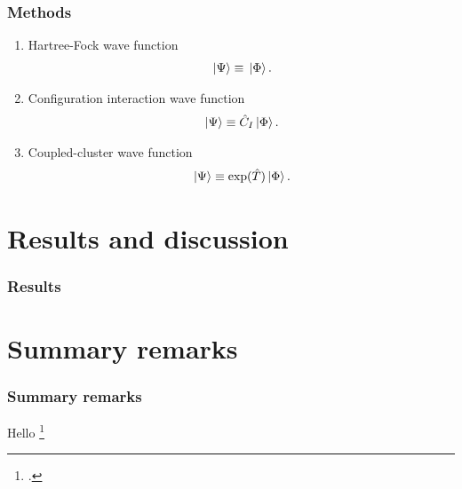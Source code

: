 \documentclass{beamer}
\begin{document}
\begin{frame}
    \frametitle{Methods}
    \begin{enumerate}
        \item Hartree-Fock wave function
            \begin{align}
                \ket*{\Psi} \equiv \ket*{\Phi}.
            \end{align}
        \item Configuration interaction wave function
            \begin{align}
                \ket*{\Psi} \equiv \hat{C}_{I}\ket*{\Phi}.
            \end{align}
        \item Coupled-cluster wave function
            \begin{align}
                \ket*{\Psi} \equiv \exponential(\clust)\ket*{\slat}.
            \end{align}
    \end{enumerate}
\end{frame}

\begin{frame}
\end{frame}

\section{Results and discussion}

\begin{frame}
    \frametitle{Results}
\end{frame}

\section{Summary remarks}

\begin{frame}
    \frametitle{Summary remarks}
\end{frame}

\begin{frame}
    Hello \footcite{pedersen2018symplectic}
\end{frame}
\end{document}
